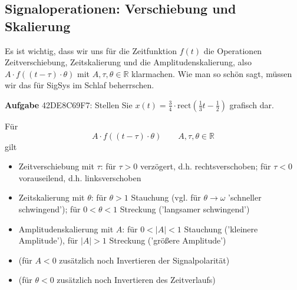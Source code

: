 \subsection{Signaloperationen: Verschiebung und Skalierung}
\label{sec:42DE8C69F7}
\begin{Ziel}
Es ist wichtig, dass wir uns für die Zeitfunktion $f(t)$
die Operationen
Zeitverschiebung,
Zeitskalierung und die Amplitudenskalierung, also
$A \cdot f(\left(t-\tau\right)\cdot \theta)$ mit $A,\tau,\theta\in\mathbb{R}$
klarmachen.
%
Wie man so schön sagt, müssen wir das für SigSys im Schlaf beherrschen.
\end{Ziel}
\textbf{Aufgabe} {\tiny 42DE8C69F7}: Stellen Sie
{$x(t) = \frac{3}{4} \cdot \mathrm{rect}(\frac{1}{3} t-\frac{1}{2})$}
grafisch dar.
\begin{Werkzeug}
Für
\begin{equation}
A \cdot f(\left(t-\tau\right)\cdot \theta)  \qquad A,\tau,\theta\in\mathbb{R}
\end{equation}
gilt
\begin{itemize}
  \item Zeitverschiebung mit
  $\tau$: für $\tau>0$ verzögert, d.h. rechtsverschoben; für $\tau<0$ vorauseilend, d.h. linksverschoben
  \item Zeitskalierung mit $\theta$: für $\theta>1$ Stauchung (vgl. für $\theta\rightarrow \omega$ 'schneller schwingend'); für $0<\theta<1$ Streckung ('langsamer schwingend')
  \item Amplitudenskalierung mit $A$: für $0<|A|<1$ Stauchung ('kleinere Amplitude'), für $|A|>1$ Streckung ('größere Amplitude')
  \item (für $A<0$ zusätzlich noch Invertieren der Signalpolarität)
  \item (für $\theta<0$ zusätzlich noch Invertieren des Zeitverlaufs)
\end{itemize}
\end{Werkzeug}
